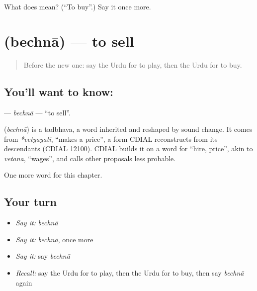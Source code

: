 \begin{tcolorbox}[breakable,colback=teal!4,colframe=teal!35!black,title={Before you move on}]
What does  mean? (\textquotedblleft{}To buy\textquotedblright{}.) Say it once more.
\end{tcolorbox}
\section[\texorpdfstring{\ur{بیچنا} (bechnā)}{بیچنا (bechnā)}]{ (bechnā) — to sell}

\label{lesson:UR-C48-bechna}



\begin{quote}
Before the new one: say the Urdu for to play, then the Urdu for to buy.
\end{quote}

\subsection*{You'll want to know: }
\textbf{} — \emph{bechnā} — \textquotedblleft{}to sell\textquotedblright{}.

\begin{cousinweb}
\textbf{} (\emph{bechnā}) is a tadbhava, a word inherited and reshaped by sound change. It comes from \emph{*vetyayati}, \textquotedblleft{}makes a price\textquotedblright{}, a form CDIAL reconstructs from its descendants (CDIAL 12100). CDIAL builds it on a word for \textquotedblleft{}hire, price\textquotedblright{}, akin to \emph{vetana}, \textquotedblleft{}wages\textquotedblright{}, and calls other proposals less probable.
\end{cousinweb}

\begin{grammarlens}[title={What you've built}]
One more word for this chapter.
\end{grammarlens}

\subsection*{Your turn}
\begin{itemize}
\raggedright
  \item \emph{Say it:} \emph{bechnā}
  \item \emph{Say it:} \emph{bechnā}, once more
  \item \emph{Say it:} say \emph{bechnā}
  \item \emph{Recall:} say the Urdu for to play, then the Urdu for to buy, then say \emph{bechnā} again
\end{itemize}

